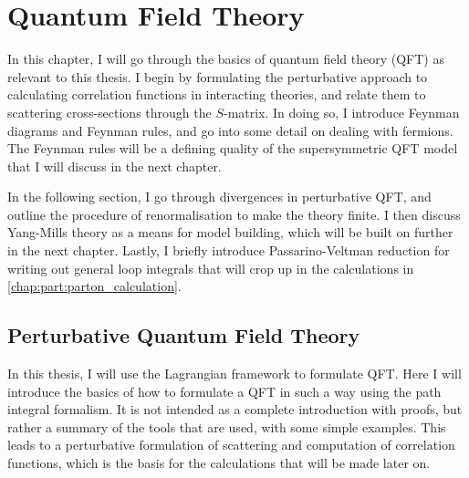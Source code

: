 \documentclass[../main.tex]{subfiles}
\begin{document}
\chapter{Quantum Field Theory}
In this chapter, I will go through the basics of quantum field theory (QFT) as relevant to this thesis.
I begin by formulating the perturbative approach to calculating correlation functions in interacting theories, and relate them to scattering cross-sections through the \(S\)-matrix.
In doing so, I introduce Feynman diagrams and Feynman rules, and go into some detail on dealing with fermions.
The Feynman rules will be a defining quality of the supersymmetric QFT model that I will discuss in the next chapter.

In the following section, I go through divergences in perturbative QFT, and outline the procedure of renormalisation to make the theory finite.
I then discuss Yang-Mills theory as a means for model building, which will be built on further in the next chapter.
Lastly, I briefly introduce Passarino-Veltman reduction for writing out general loop integrals that will crop up in the calculations in \cref{chap:part:parton_calculation}.





\section{Perturbative Quantum Field Theory}
In this thesis, I will use the Lagrangian framework to formulate QFT\@.
Here I will introduce the basics of how to formulate a QFT in such a way using the path integral formalism.
It is not intended as a complete introduction with proofs, but rather a summary of the tools that are used, with some simple examples.
This leads to a perturbative formulation of scattering and computation of correlation functions, which is the basis for the calculations that will be made later on.
\end{document}

